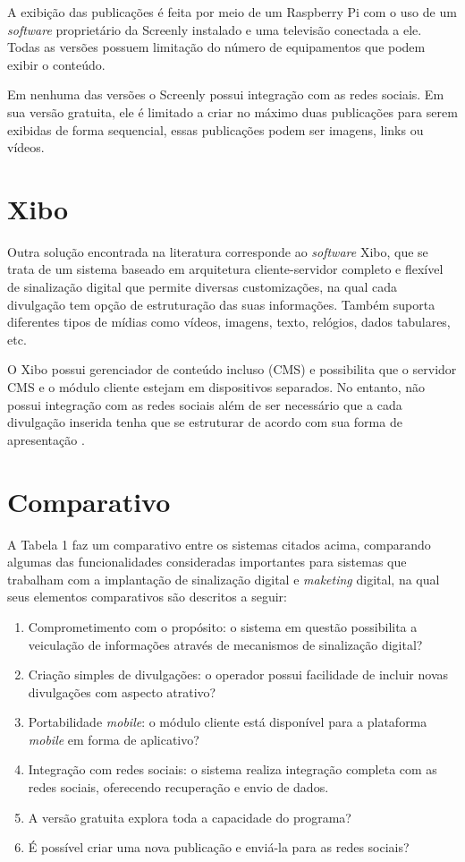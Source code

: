 A exibição das publicações é feita por meio de um Raspberry Pi com o uso de um \textit{software} proprietário da Screenly instalado e uma televisão conectada a ele. Todas as versões possuem limitação do número de equipamentos que podem exibir o conteúdo.

Em nenhuma das versões o Screenly possui integração com as redes sociais. Em sua versão gratuita, ele é limitado a criar no máximo duas publicações para serem exibidas de forma sequencial, essas publicações podem ser imagens, links ou vídeos.

\section{Xibo}
Outra solução encontrada na literatura corresponde ao \textit{software} Xibo, que se trata de um sistema baseado em arquitetura cliente-servidor completo e flexível de sinalização digital que permite diversas customizações, na qual cada divulgação tem opção de estruturação das suas informações. Também suporta diferentes tipos de mídias como vídeos, imagens, texto, relógios, dados tabulares, etc. 

O Xibo possui gerenciador de conteúdo incluso (CMS) e possibilita que o servidor CMS e o módulo cliente estejam em dispositivos separados. No entanto, não possui integração com as redes sociais além de ser necessário que a cada divulgação inserida tenha que se estruturar de acordo com sua forma de apresentação \cite{xibo2017}.

\section{Comparativo}
A Tabela 1 faz um comparativo entre os sistemas citados acima, comparando algumas das funcionalidades consideradas importantes para sistemas que trabalham com a implantação de sinalização digital e \textit{maketing} digital, na qual seus elementos comparativos são descritos a seguir:
\begin{enumerate}[label=\Roman*)]
	\item Comprometimento com o propósito: o sistema em questão possibilita a veiculação de informações através de mecanismos de sinalização digital?
	\item Criação simples de divulgações: o operador possui facilidade de incluir novas divulgações com aspecto atrativo?
	\item Portabilidade \textit{mobile}: o módulo cliente está disponível para a plataforma \textit{mobile} em forma de aplicativo?
	\item Integração com redes sociais: o sistema realiza integração completa com as redes sociais, oferecendo recuperação e envio de dados.
	\item A versão gratuita explora toda a capacidade do programa?
	\item É possível criar uma nova publicação e enviá-la para as redes sociais?
\end{enumerate}

